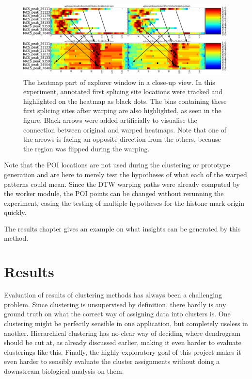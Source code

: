 \documentclass[parskip]{cs4rep}
\begin{document}
\begin{figure}[t,b]
   \centering
   \includegraphics[width=\textwidth]{figures/implementation/explorer/poi_tracking.png}
   \caption{The heatmap part of explorer window in a close-up view. In this experiment, annotated first splicing site locations were tracked and highlighted on the heatmap as black dots. The bins containing these first splicing sites after warping are also highlighted, as seen in the figure. Black arrows were added artificially to visualise the connection between original and warped heatmaps. Note that one of the arrows is facing an opposite direction from the others, because the region was flipped during the warping.}  
   \label{fig:implementation:explorer:poi-tracking}
\end{figure}

Note that the POI locations are not used during the clustering or prototype generation and are here to merely test the hypotheses of what each of the warped patterns could mean. Since the DTW warping paths were already computed by the worker module, the POI points can be changed without rerunning the experiment, easing the testing of multiple hypotheses for the histone mark origin quickly.

The results chapter gives an example on what insights can be generated by this method.

\chapter{Results}
Evaluation of results of clustering methods has always been a challenging problem. Since clustering is unsupervised by definition, there hardly is any ground truth on what the correct way of assigning data into clusters is. One clustering might be perfectly sensible in one application, but completely useless in another. Hierarchical clustering has no clear way of deciding where dendrogram should be cut at, as already discussed earlier, making it even harder to evaluate clusterings like this. Finally, the highly exploratory goal of this project makes it even harder to sensibly evaluate the cluster assignments without doing a downstream biological analysis on them.
\end{document}
